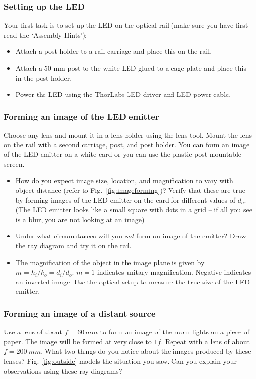 \documentclass[a4paper]{report}
\begin{document}
	\subsubsection{Setting up the LED}
	Your first task is to set up the LED on the optical rail (make sure you have first read the `Assembly Hints'):
	\begin{itemize}
    \item Attach a post holder to a rail carriage and place this on the rail.
    \item Attach a 50 mm post to the white LED glued to a cage plate and place this in the post holder.
    \item Power the LED using the ThorLabs LED driver and LED power cable.
	\end{itemize}

	\subsubsection{Forming an image of the LED emitter}
	Choose any lens and mount it in a lens holder using the lens tool. 
	Mount the lens on the rail with a second carriage, post, and post holder. 
	You can form an image of the LED emitter on a white card or you can use the plastic post-mountable screen. 
	
    \begin{itemize}
	    \item How do you expect image size, location, and magnification to vary with object distance (refer to Fig.~\ref{fig:imageforming})? Verify that these are true by forming images of the LED emitter on the card for different values of $d_o$. (The LED emitter looks like a small square with dots in a grid -- if all you see is a blur, you are not looking at an image)
	    \item Under what circumstances will you \emph{not} form an image of the emitter? Draw the ray diagram and try it on the rail.
	    \item The magnification of the object in the image plane is given by  $m = h_i / h_o = d_i / d_o$. $m=1$ indicates unitary magnification. Negative indicates an inverted image. 
	Use the optical setup to measure the true size of the LED emitter.
	\end{itemize}

    \clearpage

	\subsubsection{Forming an image of a distant source}
    Use a lens of about $f=60~mm$ to form an image of the room lights on a piece of paper.
    The image will be formed at very close to $1f$.
    Repeat with a lens of about $f=200~mm$. 
    What two things do you notice about the images produced by these lenses? 
    Fig.~\ref{fig:outside} models the situation you saw. 
    Can you explain your observations using these ray diagrams?
    
\end{document}

